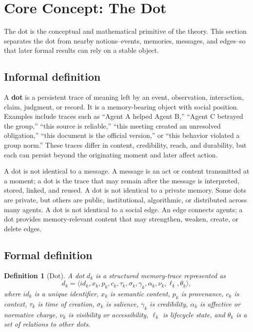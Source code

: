 \documentclass[11pt]{article}
\newtheorem{definition}{Definition}
\theoremstyle{remark}
\begin{document}
\section{Core Concept: The Dot}\label{core-concept-the-dot}

The dot is the conceptual and mathematical primitive of the theory. This section separates the dot from nearby notions--events, memories, messages, and edges--so that later formal results can rely on a stable object.

\subsection{Informal definition}\label{informal-definition}

A \textbf{dot} is a persistent trace of meaning left by an event, observation, interaction, claim, judgment, or record. It is a memory-bearing object with social position. Examples include traces such as ``Agent A helped Agent B,'' ``Agent C betrayed the group,'' ``this source is reliable,'' ``this meeting created an unresolved obligation,'' ``this document is the official version,'' or ``this behavior violated a group norm.'' These traces differ in content, credibility, reach, and durability, but each can persist beyond the originating moment and later affect action.

A dot is not identical to a message. A message is an act or content transmitted at a moment; a dot is the trace that may remain after the message is interpreted, stored, linked, and reused. A dot is not identical to a private memory. Some dots are private, but others are public, institutional, algorithmic, or distributed across many agents. A dot is not identical to a social edge. An edge connects agents; a dot provides memory-relevant content that may strengthen, weaken, create, or delete edges.

\subsection{Formal definition}\label{formal-definition}

\begin{definition}[Dot]
A dot $d_k$ is a structured memory-trace represented as
$$
d_k = \langle id_k, x_k, p_k, c_k, \tau_k, \sigma_k, \gamma_k, \alpha_k, \nu_k, \ell_k, \theta_k \rangle,
$$
where $id_k$ is a unique identifier, $x_k$ is semantic content, $p_k$ is provenance, $c_k$ is context, $\tau_k$ is time of creation, $\sigma_k$ is salience, $\gamma_k$ is credibility, $\alpha_k$ is affective or normative charge, $\nu_k$ is visibility or accessibility, $\ell_k$ is lifecycle state, and $\theta_k$ is a set of relations to other dots.
\end{definition}
\end{document}
